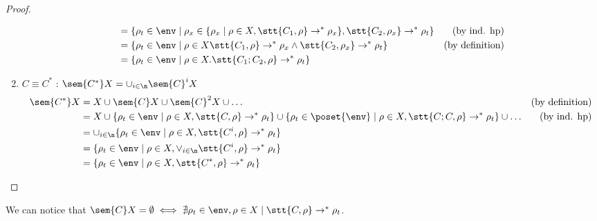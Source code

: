 \begin{proof}
\begin{enumerate}
\begin{align*}
      & = \{\rho_t \in\env \mid \rho_x \in \{\rho_x \mid \rho \in X, \stt{C_1, \rho}  \to^* \rho_x\}, \stt{C_2, \rho_x} \to^* \rho_t\} & \text{(by ind. hp)}\\
      & = \{\rho_t \in\env \mid \rho \in X \stt{C_1, \rho} \to^* \rho_x \wedge \stt{C_2, \rho_x} \to^* \rho_t\} & \text{(by definition)}\\
      & = \{\rho_t \in\env \mid \rho \in X . \stt{C_1;C_2, \rho} \to^* \rho_t\}
    \end{align*}
  \item \(C \equiv C^*\) : \(\sem{C^*}X = \cup_{i\in\n}\sem{C}^i X\)
    \begin{align*}
      \sem{C^*}X & = X \cup \sem{C}X \cup \sem{C}^2X \cup \dots & \text{(by definition)}\\
      & = X \cup \{\rho_t \in\env \mid \rho \in X, \stt{C,\rho} \to^* \rho_t\} \cup \{\rho_t \in\poset{\env} \mid \rho \in X, \stt{C;C,\rho} \to^* \rho_t\} \cup \dots & \text{(by ind. hp)}\\
      & = \cup_{i\in\n} \{\rho_t \in\env \mid \rho \in X, \stt{C^i, \rho} \to^*  \rho_t\} \\
      & = \{\rho_t \in\env \mid \rho \in X, \vee_{i\in\n} \stt{C^i, \rho} \to^* \rho_t\} \\
      & = \{\rho_t \in\env \mid \rho \in X, \stt{C^*, \rho} \to^* \rho_t\}
    \end{align*}
  \end{enumerate}
\end{proof}

We can notice that \(\sem{C}X = \emptyset \iff \nexists \rho_t\in\env,
\rho \in X \mid \stt{C,\rho} \to^* \rho_t\).
